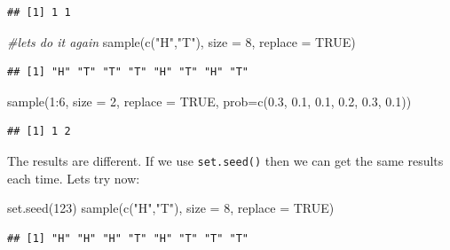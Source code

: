 \documentclass[
]{book}
\newenvironment{Shaded}{\begin{snugshade}}{\end{snugshade}}
\newcommand{\AttributeTok}[1]{\textcolor[rgb]{0.77,0.63,0.00}{#1}}
\newcommand{\CommentTok}[1]{\textcolor[rgb]{0.56,0.35,0.01}{\textit{#1}}}
\newcommand{\ConstantTok}[1]{\textcolor[rgb]{0.00,0.00,0.00}{#1}}
\newcommand{\DecValTok}[1]{\textcolor[rgb]{0.00,0.00,0.81}{#1}}
\newcommand{\FloatTok}[1]{\textcolor[rgb]{0.00,0.00,0.81}{#1}}
\newcommand{\FunctionTok}[1]{\textcolor[rgb]{0.00,0.00,0.00}{#1}}
\newcommand{\NormalTok}[1]{#1}
\newcommand{\SpecialCharTok}[1]{\textcolor[rgb]{0.00,0.00,0.00}{#1}}
\newcommand{\StringTok}[1]{\textcolor[rgb]{0.31,0.60,0.02}{#1}}
\begin{document}
\begin{verbatim}
## [1] 1 1
\end{verbatim}

\begin{Shaded}
\begin{Highlighting}[]
\CommentTok{\#let\textquotesingle{}s do it again}
\FunctionTok{sample}\NormalTok{(}\FunctionTok{c}\NormalTok{(}\StringTok{"H"}\NormalTok{,}\StringTok{"T"}\NormalTok{), }\AttributeTok{size =} \DecValTok{8}\NormalTok{, }\AttributeTok{replace =} \ConstantTok{TRUE}\NormalTok{)  }
\end{Highlighting}
\end{Shaded}

\begin{verbatim}
## [1] "H" "T" "T" "T" "H" "T" "H" "T"
\end{verbatim}

\begin{Shaded}
\begin{Highlighting}[]
\FunctionTok{sample}\NormalTok{(}\DecValTok{1}\SpecialCharTok{:}\DecValTok{6}\NormalTok{, }\AttributeTok{size =} \DecValTok{2}\NormalTok{, }\AttributeTok{replace =} \ConstantTok{TRUE}\NormalTok{, }\AttributeTok{prob=}\FunctionTok{c}\NormalTok{(}\FloatTok{0.3}\NormalTok{, }\FloatTok{0.1}\NormalTok{, }\FloatTok{0.1}\NormalTok{, }\FloatTok{0.2}\NormalTok{, }\FloatTok{0.3}\NormalTok{, }\FloatTok{0.1}\NormalTok{))}
\end{Highlighting}
\end{Shaded}

\begin{verbatim}
## [1] 1 2
\end{verbatim}

The results are different. If we use \texttt{set.seed()} then we can get the same results each time. Lets try now:

\begin{Shaded}
\begin{Highlighting}[]
\FunctionTok{set.seed}\NormalTok{(}\DecValTok{123}\NormalTok{)}
\FunctionTok{sample}\NormalTok{(}\FunctionTok{c}\NormalTok{(}\StringTok{"H"}\NormalTok{,}\StringTok{"T"}\NormalTok{), }\AttributeTok{size =} \DecValTok{8}\NormalTok{, }\AttributeTok{replace =} \ConstantTok{TRUE}\NormalTok{)  }
\end{Highlighting}
\end{Shaded}

\begin{verbatim}
## [1] "H" "H" "H" "T" "H" "T" "T" "T"
\end{verbatim}
\end{document}
